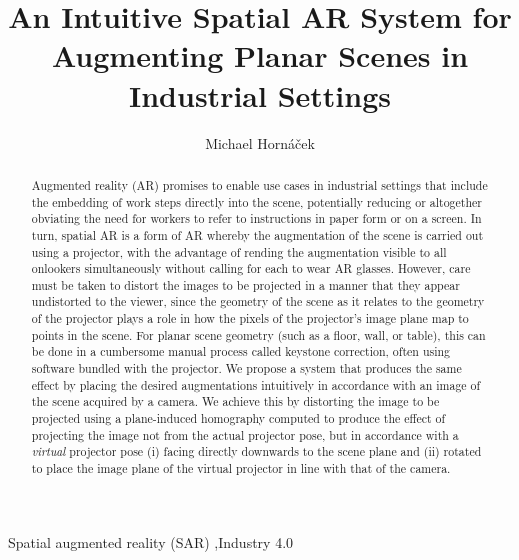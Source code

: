 \documentclass[review]{elsarticle}
\begin{document}
\begin{frontmatter}

\title{An Intuitive Spatial AR System for Augmenting Planar Scenes in Industrial Settings} %

\author{Michael Horn\'{a}\v{c}ek}
\address{Human Centered Cyber Physical Production and Assembly Systems, Institute for Management Sciences, TU Vienna, Austria}

\begin{abstract}
Augmented reality (AR) promises to enable use cases in industrial settings that include the embedding of work steps directly into the scene, potentially reducing or altogether obviating the need for workers to refer to instructions in paper form or on a screen. In turn, spatial AR is a form of AR whereby the augmentation of the scene is carried out using a projector, with the advantage of rending the augmentation visible to all onlookers simultaneously without calling for each to wear AR glasses. However, care must be taken to distort the images to be projected in a manner that they appear undistorted to the viewer, since the geometry of the scene as it relates to the geometry of the projector plays a role in how the pixels of the projector’s image plane map to points in the scene. For planar scene geometry (such as a floor, wall, or table), this can be done in a cumbersome manual process called keystone correction, often using software bundled with the projector. We propose a system that produces the same effect by placing the desired augmentations intuitively in accordance with an image of the scene acquired by a camera. We achieve this by distorting the image to be projected using a plane-induced homography computed to produce the effect of projecting the image not from the actual projector pose, but in accordance with a \textit{virtual} projector pose (i) facing directly downwards to the scene plane and (ii) rotated to place the image plane of the virtual projector in line with that of the camera.  
\end{abstract}

\begin{keyword}
Spatial augmented reality (SAR) \sep Industry 4.0
\end{keyword}

\end{frontmatter}
\end{document}
